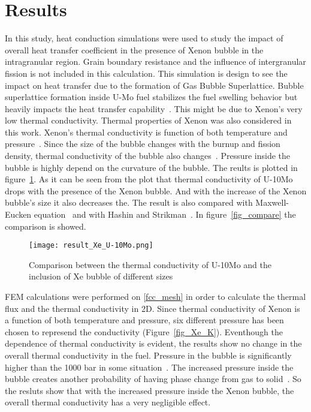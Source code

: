 \section{Results}
\begin{doublespacing}
In this study, heat conduction simulations were used to study the impact of overall heat transfer coefficient in the presence of Xenon bubble in the intragranular region. Grain boundary resistance and the influence of intergranular fission is not included in this calculation. This simulation is design to see the impact on heat transfer due to the formation of Gas Bubble Superlattice. Bubble superlattice formation inside U-Mo fuel stabilizes the fuel swelling behavior but heavily impacts the heat transfer capability~\cite{burkes2015thermal}. This might be due to Xenon's very low thermal conductivity. Thermal properties of Xenon was also considered in this work. Xenon's thermal conductivity is function of both temperature and pressure~\cite{rabinovich1987thermophysical}. Since the size of the bubble changes with the burnup and fission density, thermal conductivity of the bubble also changes~\cite{miller2012advantages}. Pressure inside the bubble is highly depend on the curvature of the bubble. The reults is plotted in figure~\ref{fig_result}. As it can be seen from the plot that thermal conductivity of U-10Mo drops with the presence of the Xenon bubble. And with the increase of the Xenon bubble's size it also decreases the. The result is also compared with Maxwell-Eucken equation~\cite{maxwell1881treatise} and with Hashin and Strikman~\cite{hashin1962variational}. In figure~\ref{fig_compare} the comparison is showed. 

\begin{figure}[H]
\centering
\texttt{[image: result\_Xe\_U-10Mo.png]}
\caption{Comparison between the thermal conductivity of U-10Mo and the inclusion of Xe bubble of different sizes}
\label{fig_result}
\end{figure}

FEM calculations were performed on \ref{fcc_mesh} in order to calculate the thermal flux and the thermal conductivity in 2D. Since thermal conductivity of Xenon is a function of both temperature and pressure, six different pressure has been chosen to represend the conductivity (Figure~\ref{fig_Xe_K}). Eventhough the dependence of thermal conductivity is evident, the results show no change in the overall thermal conductivity in the fuel. Pressure in the bubble is significantly higher than the 1000 bar in some situation~\cite{xiao2015atomistic}. The increased pressure inside the bubble creates another probability of having phase change from gas to solid~\cite{zheng2014thermodynamics}. So the resluts show that with the increased pressure inside the Xenon bubble, the overall thermal conductivity has a very negligible effect. 



\end{doublespacing}

